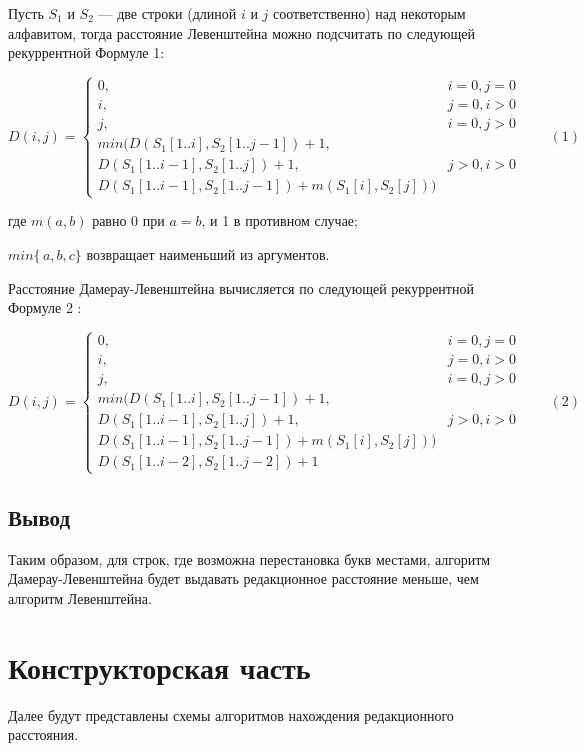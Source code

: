 \documentclass[12pt]{report}
\begin{document}
Пусть $S_{1}$ и $S_{2}$ — две строки (длиной $i$ и $j$ соответственно) над некоторым алфавитом, тогда расстояние Левенштейна можно подсчитать по следующей  рекуррентной Формуле 1:


\begin{displaymath}
	D(i,j) = \left\{ \begin{array}{ll}
		0, & \textrm{$i = 0, j = 0$}\\
		i, & \textrm{$j = 0, i > 0$}\\
		j, & \textrm{$i = 0, j > 0$}\\
		min(D(S_{1}[1..i],S_{2}[1..j-1])+1,\\
		D(S_{1}[1..i-1],S_{2}[1..j]) +1, &\textrm{$j>0, i>0$}\\
		D(S_{1}[1..i-1],S_{2}[1..j-1]) + m(S_{1}[i], S_{2}[j]))
	\end{array}\right.
	\qquad(1)
\end{displaymath}

где $m(a,b)$ равно 0 при $a=b$, и 1 в противном случае;

 $min\{\,a,b,c\}$ возвращает наименьший из аргументов.


Расстояние Дамерау-Левенштейна вычисляется по следующей рекуррентной Формуле 2 :

\begin{displaymath}
	D(i,j) = \left\{ \begin{array}{ll}
		0, & \textrm{$i = 0, j = 0$}\\
		i, & \textrm{$j = 0, i > 0$}\\
		j, & \textrm{$i = 0, j > 0$}\\
		min(D(S_{1}[1..i],S_{2}[1..j-1])+1,\\
		D(S_{1}[1..i-1],S_{2}[1..j]) +1, &\textrm{$j>0, i>0$}\\
		D(S_{1}[1..i-1],S_{2}[1..j-1]) + m(S_{1}[i], S_{2}[j]))\\
		D(S_{1}[1..i-2],S_{2}[1..j-2]) + 1
	\end{array}\right.
	\qquad(2)
\end{displaymath}
	
	
	\section*{Вывод}	
	Таким образом, для строк, где возможна перестановка букв местами, алгоритм Дамерау-Левенштейна будет выдавать редакционное расстояние меньше, чем алгоритм Левенштейна.
	
	\chapter{Конструкторская часть}
Далее будут представлены схемы алгоритмов нахождения редакционного расстояния. 
\end{document}

